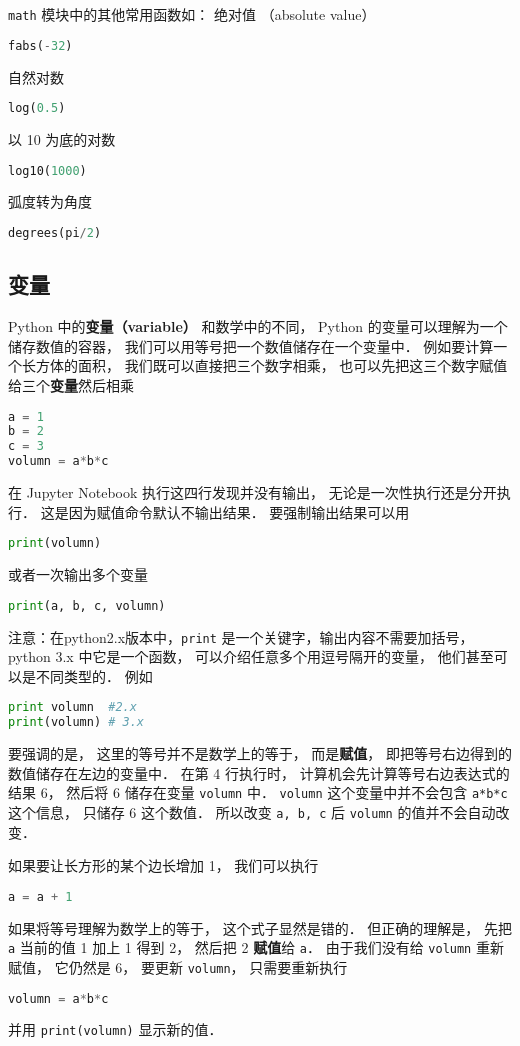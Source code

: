 \verb|math| 模块中的其他常用函数如： 绝对值 （absolute value）
\begin{lstlisting}[language=python]
fabs(-32)
\end{lstlisting}
自然对数
\begin{lstlisting}[language=python]
log(0.5)
\end{lstlisting}
以 10 为底的对数
\begin{lstlisting}[language=python]
log10(1000)
\end{lstlisting}
弧度转为角度
\begin{lstlisting}[language=python]
degrees(pi/2)
\end{lstlisting}

\subsection{变量}
Python 中的\textbf{变量（variable）} 和数学中的不同， Python 的变量可以理解为一个储存数值的容器， 我们可以用等号把一个数值储存在一个变量中． 例如要计算一个长方体的面积， 我们既可以直接把三个数字相乘， 也可以先把这三个数字赋值给三个\textbf{变量}然后相乘
\begin{lstlisting}[language=python]
a = 1
b = 2
c = 3
volumn = a*b*c
\end{lstlisting}
在 Jupyter Notebook 执行这四行发现并没有输出， 无论是一次性执行还是分开执行． 这是因为赋值命令默认不输出结果． 要强制输出结果可以用
\begin{lstlisting}[language=python]
print(volumn)
\end{lstlisting}
或者一次输出多个变量
\begin{lstlisting}[language=python]
print(a, b, c, volumn)
\end{lstlisting}
注意：在python2.x版本中，\verb|print| 是一个关键字，输出内容不需要加括号， python 3.x 中它是一个函数， 可以介绍任意多个用逗号隔开的变量， 他们甚至可以是不同类型的． 例如
\begin{lstlisting}[language=python]
print volumn  #2.x
print(volumn) # 3.x
\end{lstlisting}
要强调的是， 这里的等号并不是数学上的等于， 而是\textbf{赋值}， 即把等号右边得到的数值储存在左边的变量中． 在第 4 行执行时， 计算机会先计算等号右边表达式的结果 6， 然后将 6 储存在变量 \verb|volumn| 中． \verb|volumn| 这个变量中并不会包含 \verb|a*b*c| 这个信息， 只储存 6 这个数值． 所以改变 \verb|a, b, c| 后 \verb|volumn| 的值并不会自动改变．

如果要让长方形的某个边长增加 1， 我们可以执行
\begin{lstlisting}[language=python]
a = a + 1
\end{lstlisting}
如果将等号理解为数学上的等于， 这个式子显然是错的． 但正确的理解是， 先把 \verb|a| 当前的值 1 加上 1 得到 2， 然后把 2 \textbf{赋值}给 \verb|a|． 由于我们没有给 \verb|volumn| 重新赋值， 它仍然是 6， 要更新 \verb|volumn|， 只需要重新执行
\begin{lstlisting}[language=python]
volumn = a*b*c
\end{lstlisting}
并用 \verb|print(volumn)| 显示新的值．

